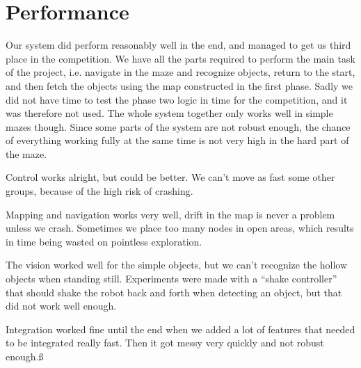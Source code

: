 \section{Performance}
Our system did perform reasonably well in the end, and managed to get us third place in the competition. 
We have all the parts required to perform the main task of the project, i.e. navigate in the maze and recognize objects, return to the start, and then fetch the objects using the map constructed in the first phase. 
Sadly we did not have time to test the phase two logic in time for the competition, and it was therefore not used.
The whole system together only works well in simple mazes though. 
Since some parts of the system are not robust enough, the chance of everything working fully at the same time is not very high in the hard part of the maze. 

Control works alright, but could be better. 
We can't move as fast some other groups, because of the high risk of crashing. 

Mapping and navigation works very well, drift in the map is never a problem unless we crash. Sometimes we place too many nodes in open areas, which results in time being wasted on pointless exploration.

The vision worked well for the simple objects, but we can't recognize the hollow objects when standing still. 
Experiments were made with a ``shake controller'' that should shake the robot back and forth when detecting an object, but that did not work well enough.

Integration worked fine until the end when we added a lot of features that needed to be integrated really fast. Then it got messy very quickly and not robust enough.ß